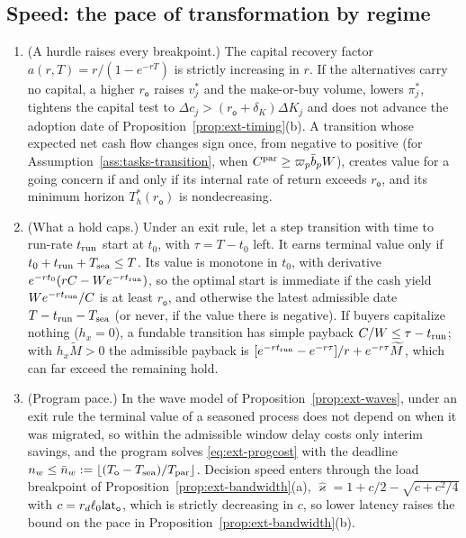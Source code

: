 \subsection{Speed: the pace of transformation by regime}\label{sec:regimes-speed}

\begin{proposition}\label{prop:reg-speed}
\begin{enumerate}
\item[(a)] (A hurdle raises every breakpoint.) The capital recovery factor $a(r,T)=r/(1-e^{-rT})$ is strictly increasing in $r$. If the alternatives carry no capital, a higher $r_{\mathsf o}$ raises $v^*_j$ and the make-or-buy volume, lowers $\pi^*_j$, tightens the capital test to $\Delta c_j>(r_{\mathsf o}+\delta_K)\Delta K_j$ and does not advance the adoption date of Proposition~\ref{prop:ext-timing}(b). A transition whose expected net cash flow changes sign once, from negative to positive (for Assumption~\ref{ass:tasks-transition}, when $C^{\rm par}\ge\varpi_p\bar b_pW$), creates value for a going concern if and only if its internal rate of return exceeds $r_{\mathsf o}$, and its minimum horizon $T^*_h(r_{\mathsf o})$ is nondecreasing.
\item[(b)] (What a hold caps.) Under an exit rule, let a step transition with time to run-rate $t_{\rm run}$ start at $t_0$, with $\tau=T-t_0$ left. It earns terminal value only if $t_0+t_{\rm run}+T_{\rm sea}\le T$. Its value is monotone in $t_0$, with derivative $e^{-rt_0}(rC-We^{-rt_{\rm run}})$, so the optimal start is immediate if the cash yield $We^{-rt_{\rm run}}/C$ is at least $r_{\mathsf o}$, and otherwise the latest admissible date $T-t_{\rm run}-T_{\rm sea}$ (or never, if the value there is negative). If buyers capitalize nothing ($h_x=0$), a fundable transition has simple payback $C/W\le\tau-t_{\rm run}$; with $h_x\widetilde M>0$ the admissible payback is $[e^{-rt_{\rm run}}-e^{-r\tau}]/r+e^{-r\tau}\widetilde M$, which can far exceed the remaining hold.
\item[(c)] (Program pace.) In the wave model of Proposition~\ref{prop:ext-waves}, under an exit rule the terminal value of a seasoned process does not depend on when it was migrated, so within the admissible window delay costs only interim savings, and the program solves \eqref{eq:ext-progcost} with the deadline $n_w\le\bar n_w:=\lfloor(T_{\mathsf o}-T_{\rm sea})/T_{\rm par}\rfloor$. Decision speed enters through the load breakpoint of Proposition~\ref{prop:ext-bandwidth}(a), $\hat\varkappa=1+c/2-\sqrt{c+c^2/4}$ with $c=r_d\ell_0{\rm lat}_{\mathsf o}$, which is strictly decreasing in $c$, so lower latency raises the bound on the pace in Proposition~\ref{prop:ext-bandwidth}(b).
\end{enumerate}
\end{proposition}


